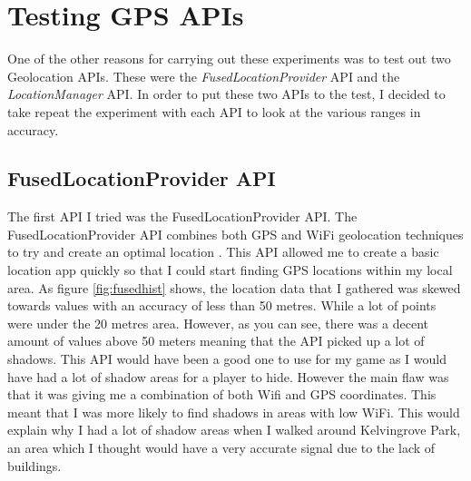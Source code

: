 \documentclass{l4proj}
\begin{document}
\section{Testing GPS APIs}
One of the other reasons for carrying out these experiments was to test out two Geolocation APIs. These
were the \emph{FusedLocationProvider} API and the \emph{LocationManager} API. In order to put these two
APIs to the test, I decided to take repeat the experiment with each API to look at the various ranges in
accuracy.

\subsection{FusedLocationProvider API}
\label{fusedProvider}
The first API I tried was the FusedLocationProvider API. The FusedLocationProvider API combines both GPS and WiFi geolocation
techniques to try and create an optimal location \citep{fused}. This API allowed me to create a basic location app quickly so that I could start finding GPS locations
within my local area. As figure \ref{fig:fusedhist} shows, the location data that I gathered was skewed towards values with an accuracy of less than 50 metres. While a lot of
points were under the 20 metres area. However, as you can see, there was a decent amount of values above 50 meters meaning that the API picked up a lot of shadows.
This API would have been a good one to use for my game as I would have had a lot of shadow areas for a player to hide. However the main flaw was that
it was giving me a combination of both Wifi and GPS coordinates. This meant that I was more likely to find shadows in areas with low WiFi. This would
explain why I had a lot of shadow areas when I walked around Kelvingrove Park, an area which I thought would have a very accurate signal due to the lack of buildings.
\end{document}
